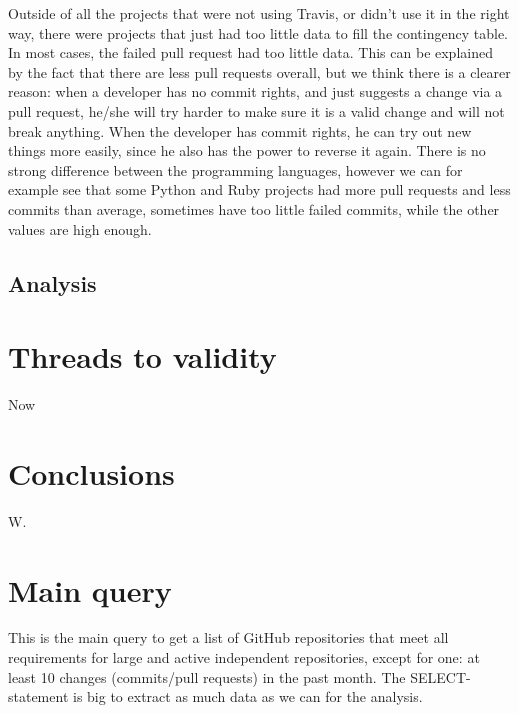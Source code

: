\documentclass[a4paper,11pt]{article}
\begin{document}
			Outside of all the projects that were not using Travis, or didn't use it in the right way, there were projects that just had too little data to fill the contingency table. In most cases, the failed pull request had too little data. This can be explained by the fact that there are less pull requests overall, but we think there is a clearer reason: when a developer has no commit rights, and just suggests a change via a pull request, he/she will try harder to make sure it is a valid change and will not break anything. When the developer has commit rights, he can try out new things more easily, since he also has the power to reverse it again. There is no strong difference between the programming languages, however we can for example see that some Python and Ruby projects had more pull requests and less commits than average, sometimes have too little failed commits, while the other values are high enough. \\
			
		\subsection{Analysis}
			
			
	\section{Threads to validity}
		Now 
	
	\section{Conclusions}
		W.

	\appendix
	\section{Main query}
	\label{app:mainquery}
	This is the main query to get a list of GitHub repositories that meet all requirements for large and active independent repositories, except for one: at least 10 changes (commits/pull requests) in the past month. The SELECT-statement is big to extract as much data as we can for the analysis.
	
\end{document}
